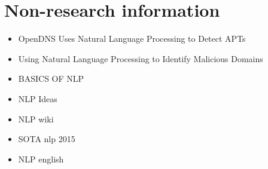 \documentclass[9pt]{article}
\begin{document}
\section{Non-research information}
\begin{itemize}
\item OpenDNS Uses Natural Language Processing to Detect APTs \cite{opendns}
\item Using Natural Language Processing to Identify Malicious Domains
\item BASICS OF NLP \cite{nlp}
\item NLP Ideas \cite{ideas}
\item NLP wiki \cite{wiki}
\item SOTA nlp 2015 \cite{reddit sota}
\item NLP english \cite{eng wiki}
\end{itemize}
\newpage
\end{document}
